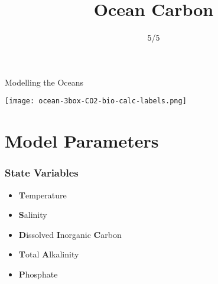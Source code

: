 \documentclass[aspectratio=169]{beamer}
\title{Ocean Carbon}
\author{5/5}
\begin{document}
\begin{frame}{Modelling the Oceans}
    
    \texttt{[image: ocean-3box-CO2-bio-calc-labels.png]}
        
\end{frame}


    
        



\section{Model Parameters}

\begin{frame}
    \frametitle{State Variables}
    \begin{itemize}
        \item \textbf{T}emperature
        \item \textbf{S}alinity
        \item \textbf{D}issolved \textbf{I}norganic \textbf{C}arbon
        \item \textbf{T}otal \textbf{A}lkalinity
        \item \textbf{P}hosphate
    \end{itemize}

\end{frame}
\end{document}
